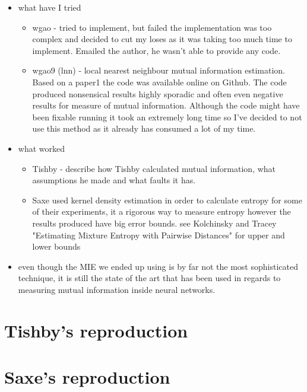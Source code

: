 \begin{itemize}
{    }
  \item{
      what have I tried
      \begin{itemize}
        \item{
            wgao - tried to implement, but failed the implementation was too
            complex and decided to cut my loses as it was taking too much time
            to implement. Emailed the author, he wasn't able to provide any
            code.
          }
        \item{
            wgao9 (lnn) - local nearest neighbour mutual information estimation.
            Based on a paper1 the code was available online on Github.
            The code produced nonsensical results highly sporadic and often even
            negative results for measure of mutual information. Although the
            code might have been fixable running it took an extremely long time
            so I've decided to not use this method as it already has consumed a
            lot of my time.
          }
      \end{itemize}
    }
  \item{
      what worked
      \begin{itemize}
        \item{
            Tishby - describe how Tishby calculated mutual information, what
            assumptions he made and what faults it has.
          }
        \item{
            Saxe used kernel density estimation in order to calculate entropy
            for some of their experiments, it a rigorous way to measure entropy
            however the results produced have big error bounds. see Kolchinsky
            and Tracey "Estimating Mixture Entropy with Pairwise Distances" for
            upper and lower bounds
          }
      \end{itemize}
    }
  \item{
      even though the MIE we ended up using is by far not the most sophisticated
      technique, it is still the state of the art that has been used in regards
      to measuring mutual information inside neural networks.
    }
\end{itemize}
    


\section{Tishby's reproduction}
\section{Saxe's reproduction}

